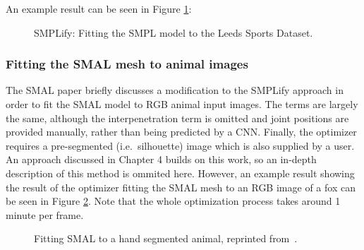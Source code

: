 An example result can be seen in Figure \ref{fig:smplify}:

\begin{figure}[H] %
    \caption{SMPLify: Fitting the SMPL model to the Leeds Sports Dataset.}
    \label{fig:smplify}
\end{figure}

\subsubsection{Fitting the SMAL mesh to animal images}
The SMAL paper briefly discusses a modification to the SMPLify approach in order to fit the SMAL model to RGB animal input images. The terms are largely the same, although the interpenetration term is omitted and joint positions are provided manually, rather than being predicted by a CNN. Finally, the optimizer requires a pre-segmented (i.e.\ silhouette) image which is also supplied by a user. An approach discussed in Chapter 4 builds on this work, so an in-depth description of this method is ommited here. However, an example result showing the result of the optimizer fitting the SMAL mesh to an RGB image of a fox can be seen in Figure \ref{fig:smalify}. Note that the whole optimization process takes around 1 minute per frame.

\begin{figure}[H] %
    \caption{Fitting SMAL to a hand segmented animal, reprinted from~\cite{zuffi2017menagerie}.}
    \label{fig:smalify}
\end{figure}

